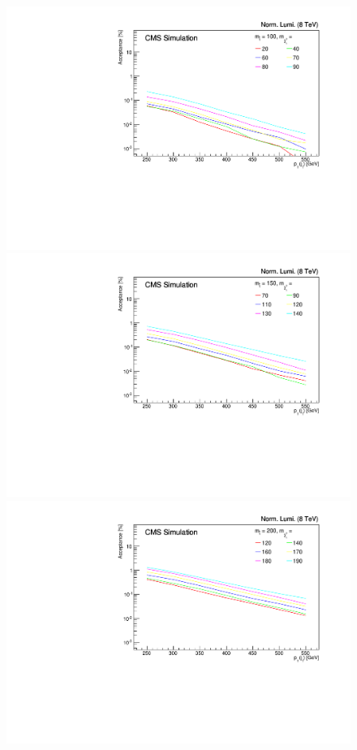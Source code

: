 \begin{figure}[ht!]
  \begin{center}
  \includegraphics[scale=0.35]{Figures/sus13009/limitplots/plots/stop/acceptance_100.pdf}
  \includegraphics[scale=0.35]{Figures/sus13009/limitplots/plots/stop/acceptance_150.pdf}
  \includegraphics[scale=0.35]{Figures/sus13009/limitplots/plots/stop/acceptance_200.pdf} 

\end{center}
\end{figure}
